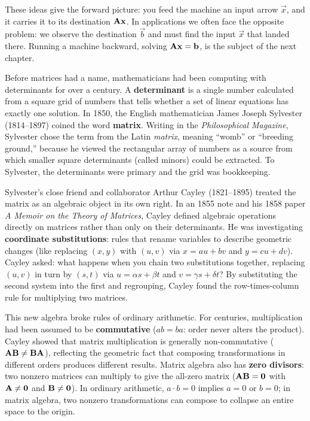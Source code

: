These ideas give the forward picture: you feed the machine an
input arrow $\vec{x}$, and it carries it to its destination $\mathbf{A}\mathbf{x}$.
In applications we often face the opposite problem: we observe
the destination $\vec{b}$ and must find the input $\vec{x}$ that
landed there. Running a machine backward, solving $\mathbf{A}\mathbf{x} = \mathbf{b}$,
is the subject of the next chapter.

\begin{historybox}
Before matrices had a name, mathematicians had been computing with determinants
for over a century. A \textbf{determinant} is a single number calculated from a
square grid of numbers that tells whether a set of linear equations has
exactly one solution. In 1850, the English mathematician James Joseph Sylvester
(1814--1897) coined the word \textbf{matrix}. Writing in the \emph{Philosophical
Magazine}, Sylvester chose the term from the Latin \emph{matrix}, meaning
``womb'' or ``breeding ground,'' because he viewed the rectangular array of
numbers as a source from which smaller square determinants (called minors) could be
extracted. To Sylvester, the determinants were primary and the grid was bookkeeping.

Sylvester's close friend and collaborator Arthur Cayley (1821--1895) treated the
matrix as an algebraic object in its own right. In an 1855 note and his
1858 paper \emph{A Memoir on the Theory of Matrices}, Cayley defined algebraic
operations directly on matrices rather than only on their determinants. He was investigating
\textbf{coordinate substitutions}: rules that rename variables to
describe geometric changes (like replacing $(x,y)$ with $(u,v)$ via
$x = a u + b v$ and $y = c u + d v$). Cayley asked: what happens when you chain
two substitutions together, replacing $(u,v)$ in turn by $(s,t)$ via
$u = \alpha s + \beta t$ and $v = \gamma s + \delta t$? By substituting the
second system into the first and regrouping, Cayley found the
row-times-column rule for multiplying two matrices.

This new algebra broke rules of ordinary arithmetic. For
centuries, multiplication had been assumed to be \textbf{commutative} ($ab = ba$:
order never alters the product). Cayley showed that matrix multiplication
is generally non-commutative ($\mathbf{A}\mathbf{B} \neq \mathbf{B}\mathbf{A}$), reflecting
the geometric fact that composing transformations in different orders
produces different results. Matrix algebra also has \textbf{zero divisors}:
two nonzero matrices can multiply to give the all-zero matrix ($\mathbf{A}\mathbf{B}
= \mathbf{0}$ with $\mathbf{A}\neq\mathbf{0}$ and $\mathbf{B}\neq\mathbf{0}$). In ordinary arithmetic,
$a \cdot b = 0$ implies $a=0$ or $b=0$; in matrix algebra, two nonzero transformations
can compose to collapse an entire space to the origin.


\end{historybox}
